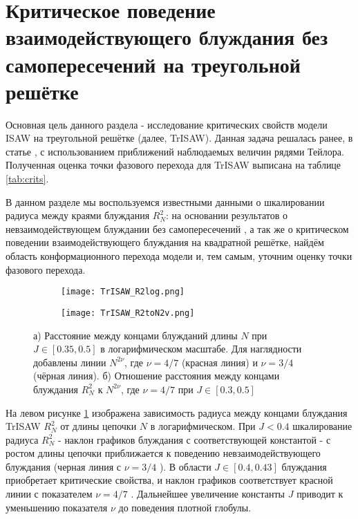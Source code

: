 \section{Критическое поведение взаимодействующего блуждания без самопересечений на треугольной решётке}

Основная цель данного раздела - исследование критических свойств модели ISAW на треугольной решётке (далее, TrISAW).
Данная задача решалась ранее, в статье \cite{Privman1986}, с использованием приближений наблюдаемых величин рядями Тейлора.
Полученная оценка точки фазового перехода для TrISAW выписана на таблице \ref{tab:crits}.

В данном разделе мы воспользуемся известными данными о шкалировании радиуса между краями блуждания $R^2_N$:
на основании результатов о невзаимодействующем блуждании без самопересечений \cite{Rensburg2015}, а так же о критическом поведении взаимодействующего блуждания \cite{Duplantier1987} на квадратной решётке,
найдём область конформационного перехода модели и, тем самым, уточним оценку точки фазового перехода.
 

\begin{figure}[h]
\begin{subfigure}{0.49\textwidth}
\texttt{[image: TrISAW\_R2log.png]}
\caption{}
\label{fig:TrISAW_R2log}
\end{subfigure}
\hfill
\begin{subfigure}{0.49\textwidth}
\texttt{[image: TrISAW\_R2toN2v.png]}
\caption{}
\label{fig:TrISAW_R2toN2v}
\end{subfigure}
\caption{а) Расстояние между концами блужданий длины $N$ при $J \in [0.35,0.5]$ в логарифмическом масштабе. 
Для наглядности добавлены линии $N^{2\nu}$, где $\nu = 4/7$ (красная линия) и $\nu=3/4$ (чёрная линия).
б) Отношение расстояния между концами блуждания $R^2_N$ к $N^{2\nu}$, где $\nu=4/7$ при $J \in [0.3,0.5]$}
\end{figure}

На левом рисунке \ref{fig:TrISAW_R2log} изображена зависимость радиуса между концами блуждания TrISAW $R^2_N$ от длины цепочки $N$ в логарифмическом.
При $J < 0.4$ шкалирование радиуса $R^2_N$ - наклон графиков блуждания с соответствующей константой - с ростом длины цепочки приближается к поведению невзаимодействующего блуждания (черная линия с $\nu = 3/4$ \cite{Rensburg2015}).
В области $J \in [0.4, 0.43]$ блуждания приобретает критические свойства, и наклон графиков соответствует красной линии с показателем $\nu=4/7$ \cite{Duplantier1987}.
Дальнейшее увеличение константы $J$ приводит к уменьшению показателя $\nu$ до поведения плотной глобулы.

